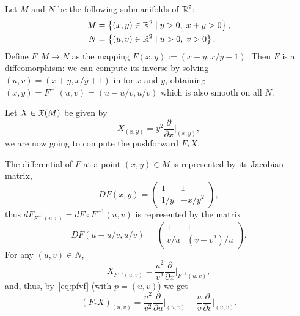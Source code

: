 \begin{example}
  Let $M$ and $N$ be the following submanifolds of $\mathbb{R}^2$:
  \begin{align}
    M &= \left\{(x,y)\in\mathbb{R}^2 \mid y>0,\; x+y>0\right\},\\
    N &= \left\{(u,v)\in\mathbb{R}^2 \mid u>0,\; v>0 \right\}.
  \end{align}
  Define $F:M\to N$ as the mapping $F(x,y):=(x+y, x/y+1)$.
  Then $F$ is a diffeomorphism: we can compute its inverse by solving $(u,v)=(x+y, x/y+1)$ in for $x$ and $y$, obtaining $(x,y)=F^{-1}(u,v)=(u-u/v, u/v)$ which is also smooth on all $N$.
  
  Let $X\in\mathfrak{X}(M)$ be given by
  \begin{equation}
    X_{(x,y)} = y^2\frac{\partial}{\partial x}\Big|_{(x,y)},
  \end{equation}
  we are now going to compute the pushforward $F_* X$.
  
  The differential of $F$ at a point $(x,y)\in M$ is represented by its Jacobian matrix,
  \begin{equation}
    DF(x,y) = \begin{pmatrix}
      1 & 1\\
      1/y & -x/y^2
    \end{pmatrix},
  \end{equation}
  thus $dF_{F^{-1}(u,v)} = dF\circ F^{-1}(u,v)$ is represented by the matrix
  \begin{equation}
    DF(u-u/v, u/v) = \begin{pmatrix}
      1 & 1\\
      v/u & (v-v^2)/u
    \end{pmatrix}.
  \end{equation}
  For any $(u,v)\in N$,
  \begin{equation}
    X_{F^{-1}(u,v)} = \frac{u^2}{v^2}\frac{\partial}{\partial x}\Big|_{F^{-1}(u,v)},
  \end{equation}
  and, thus, by~\eqref{eq:pfvf} (with $p=(u,v)$) we get
  \begin{equation}
    (F_*X)_{(u,v)} = \frac{u^2}{v^2}\frac{\partial}{\partial u}\Big|_{(u,v)} + \frac{u}{v}\frac{\partial}{\partial v}\Big|_{(u,v)}.
  \end{equation}
\end{example}

